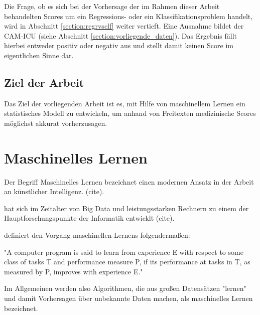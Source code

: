 Die Frage, ob es sich bei der Vorhersage der im Rahmen dieser Arbeit behandelten Scores um ein Regressions- oder ein Klassifikationsproblem handelt, wird in Abschnitt \ref{section:regrvsclf} weiter vertieft. Eine Ausnahme bildet der CAM-ICU (siehe Abschnitt \ref{section:vorliegende_daten}). Das Ergebnis fällt hierbei entweder positiv oder negativ aus und stellt damit keinen Score im eigentlichen Sinne dar.

\subsection{Ziel der Arbeit}
Das Ziel der vorliegenden Arbeit ist es, mit Hilfe von maschinellem Lernen ein statistisches Modell zu entwickeln, um anhand von Freitexten medizinische Scores möglichst akkurat vorherzusagen.

\section{Maschinelles Lernen}

Der Begriff Maschinelles Lernen bezeichnet einen modernen Ansatz in der Arbeit an künstlicher Intelligenz. (cite).

hat sich im Zeitalter von Big Data und leistungsstarken Rechnern zu einem der Hauptforschungspunkte der Informatik entwicklt (cite). 

\citet{mitchellMachineLearning1997} definiert den Vorgang maschinellen Lernens folgendermaßen:

\begin{itquote}
    {\foreignlanguage{english}{"A computer program is said to learn from experience E with respect to some class of tasks T and performance measure P, if its performance at tasks in T, as measured by P, improves with experience E."}}
\end{itquote}


Im Allgemeinen werden also Algorithmen, die aus großen Datensätzen "lernen" und damit Vorhersagen über unbekannte Daten machen, als maschinelles Lernen bezeichnet.

